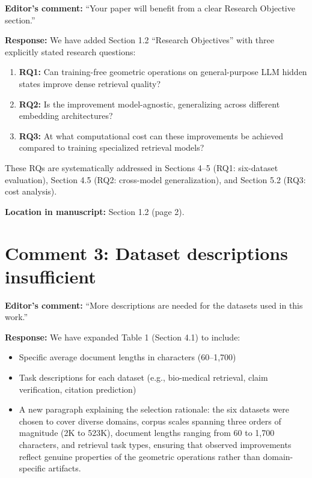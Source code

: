 \documentclass[11pt]{article}
\begin{document}
\textbf{Editor's comment:} ``Your paper will benefit from a clear Research Objective section.''

\textbf{Response:} We have added Section 1.2 ``Research Objectives'' with three explicitly stated research questions:
\begin{enumerate}
\item \textbf{RQ1:} Can training-free geometric operations on general-purpose LLM hidden states improve dense retrieval quality?
\item \textbf{RQ2:} Is the improvement model-agnostic, generalizing across different embedding architectures?
\item \textbf{RQ3:} At what computational cost can these improvements be achieved compared to training specialized retrieval models?
\end{enumerate}

These RQs are systematically addressed in Sections 4--5 (RQ1: six-dataset evaluation), Section 4.5 (RQ2: cross-model generalization), and Section 5.2 (RQ3: cost analysis).

\textbf{Location in manuscript:} Section 1.2 (page 2).

\section*{Comment 3: Dataset descriptions insufficient}

\textbf{Editor's comment:} ``More descriptions are needed for the datasets used in this work.''

\textbf{Response:} We have expanded Table 1 (Section 4.1) to include:
\begin{itemize}[leftmargin=*]
\item Specific average document lengths in characters (60--1,700)
\item Task descriptions for each dataset (e.g., bio-medical retrieval, claim verification, citation prediction)
\item A new paragraph explaining the selection rationale: the six datasets were chosen to cover diverse domains, corpus scales spanning three orders of magnitude (2K to 523K), document lengths ranging from 60 to 1,700 characters, and retrieval task types, ensuring that observed improvements reflect genuine properties of the geometric operations rather than domain-specific artifacts.
\end{itemize}
\end{document}
